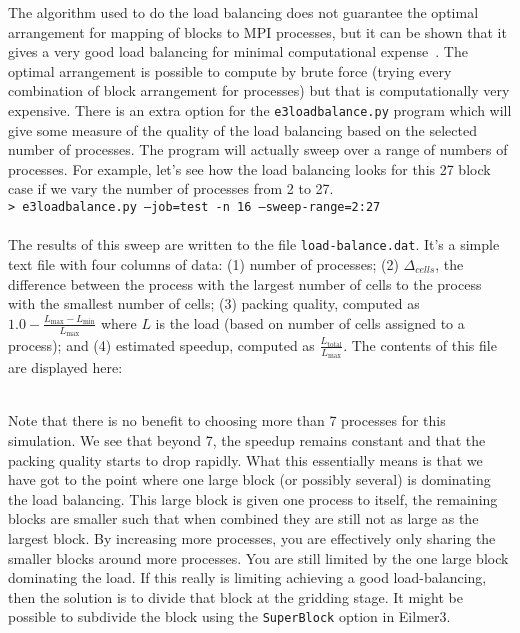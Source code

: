 The algorithm used to do the load balancing does not guarantee the
optimal arrangement for mapping of blocks to MPI processes,
but it can be shown that it gives a very good load balancing for
minimal computational expense~\cite{graham_1969}.
The optimal arrangement is possible to compute by brute force (trying
every combination of block arrangement for processes) but
that is computationally very expensive.
There is an extra option for the \texttt{e3loadbalance.py}
program which will give some measure of the quality of
the load balancing based on the selected number of
processes.
The program will actually sweep over a range of
numbers of processes.
For example, let's see how the load balancing looks
for this 27 block case if we vary the number
of processes from 2 to 27.
%
\topbar\\
\texttt{> e3loadbalance.py --job=test -n 16 --sweep-range=2:27}\\
\bottombar\\
%
The results of this sweep are written to the file \texttt{load-balance.dat}.
It's a simple text file with four columns of data:
(1) number of processes;
(2) $\Delta_{cells}$, the difference between
the process with the largest number of cells to the process
with the smallest number of cells;
(3) packing quality, computed as $1.0 - \frac{L_{\text{max}} - L_{\text{min}}}{L_{\text{max}}}$
where $L$ is the load (based on number of cells assigned to a process);
and (4) estimated speedup, computed as $\frac{L_{\text{total}}}{L_{\text{max}}}$.
The contents of this file are displayed here:\\
\topbar

\bottombar\\
Note that there is no benefit to choosing more than 7 processes for this simulation.
We see that beyond 7, the speedup remains constant and that
the packing quality starts to drop rapidly.
What this essentially means is that we have got to the point
where one large block (or possibly several) is dominating the
load balancing.
This large block is given one process to itself, the remaining
blocks are smaller such that when combined
they are still not as large as the largest block.
By increasing more processes, you are effectively only sharing
the smaller blocks around more processes.
You are still limited by the one large block dominating the load.
If this really is limiting achieving a good load-balancing, then
the solution is to divide that block at the gridding stage.
It might be possible to subdivide the block using
the \texttt{SuperBlock} option in Eilmer3.



